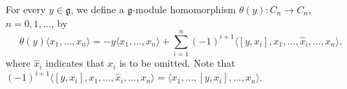 For every $y \in \mathfrak{g}$, we define a $\mathfrak{g}$-module homomorphism $\theta(y) : C_n \rightarrow C_n$, $n = 0, 1, \ldots$, by
$$\theta(y) \langle x_1, \ldots, x_n \rangle = -y \langle x_1, \ldots, x_n \rangle + \sum_{i=1}^{n} (-1)^{i+1} \langle [y, x_i], x_1, \ldots, \hat{x}_i, \ldots, x_n \rangle,$$
where $\hat{x}_i$ indicates that $x_i$ is to be omitted. Note that $(-1)^{i+1} \langle [y, x_i], x_1, \ldots, \hat{x}_i, \ldots, x_n \rangle = \langle x_1, \ldots, [y, x_i], \ldots, x_n \rangle$.
